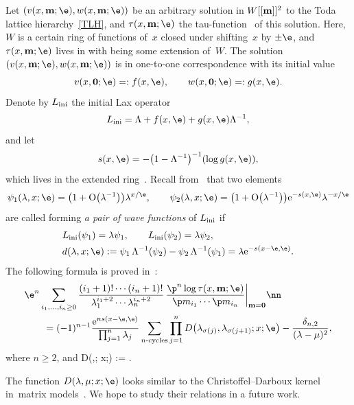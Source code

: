 Let $(v(x,{\bf m};\e), w(x,{\bf m};\e))$ be an arbitrary solution in $W[[{\bf m}]]^2$
to the Toda lattice hierarchy~\eqref{TLH}, and $\tau(x,{\bf m};\e)$ the tau-function~\cite{CDZ, DY, DZ-toda} of this solution.
Here, $W$ is a certain ring of functions of~$x$ closed under shifting~$x$
by $\pm \e$, and $\tau(x,{\bf m};\e)$ lives in  with  being some extension of~$W$.
The solution $(v(x,{\bf m};\e), w(x,{\bf m};\e))$ is in one-to-one correspondence
with its initial value
\[
v(x,{\bf 0};\e)=:f(x,\e), \qquad w(x,{\bf 0}; \e)=:g(x,\e).
\]
Denote by $L_{\rm ini}$ the initial Lax operator
\[
L_{\rm ini}=\Lambda+f(x,\e) + g(x,\e)\Lambda^{-1},
\]
and let
\[
s(x,\e) = - \bigl(1-\Lambda^{-1}\bigr)^{-1} (\log g(x,\e)),
\]
which lives in the extended ring~.
Recall from~\cite{Y} that two elements
\[
 \psi_1(\lambda,x;\e) = \bigl(1+{\rm O}\bigl(\lambda^{-1}\bigr)\bigr)\lambda^{x/\e}, \qquad
\psi_2(\lambda,x;\e)=\bigl(1+{\rm O}\bigl(\lambda^{-1}\bigr)\bigr){\rm e}^{-s(x,\e)}\lambda^{-x/\e}
\]
are called forming {\it a pair of wave functions} of $L_{\rm ini}$ if
\begin{align*}%
& L_{\rm ini} (\psi_1) = \lambda \psi_1, \qquad L_{\rm ini} (\psi_2) = \lambda \psi_2,\\
& d(\lambda,x;\e):= \psi_1 \, \Lambda^{-1}(\psi_2) - \psi_2 \, \Lambda^{-1}(\psi_1) = \lambda {\rm e}^{-s(x-\e,\e)}.
\end{align*}
The following formula is proved in~\cite{Y}:
\begin{align}
& \e^n \sum_{i_1,\dots,i_n\ge0}
\frac{(i_1+1)! \cdots (i_n+1)!} {\lambda_1^{i_1+2}\cdots \lambda_n^{i_n+2}} \,
\frac{\p^n \log \tau(x,{\bf m};\e)}{\p m_{i_1} \cdots \p m_{i_n}}\bigg|_{{\bf m}={\bf 0}}\nn\\
&\qquad{}= (-1)^{n-1} \frac{{\rm e}^{n s(x-\e,\e)}}{\prod_{j=1}^n \lambda_j} \sum_{\text{$n$-cycles}}
\prod_{j=1}^n D\bigl(\lambda_{\sigma(j)},\lambda_{\sigma(j+1)}; x;\e\bigr) - \frac{\delta_{n,2}}{(\lambda-\mu)^2},\label{Y421}
\end{align}
where $n\ge2$, and
\beq\label{dpsiabtoda}
D(\lambda,\mu; x;\e) := .
\eeq
\begin{Remark}
The function $D(\lambda,\mu; x;\e)$ looks similar to the
Christoffel--Darboux kernel in~matrix models~\cite{Deift, Mehta}.
We hope to study their relations in a future work.
\end{Remark}

